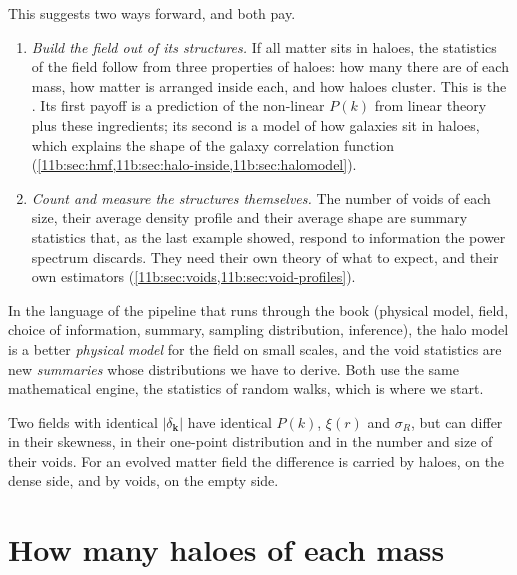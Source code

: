 This suggests two ways forward, and both pay.
\begin{enumerate}[label=(\arabic*),itemsep=1pt]
  \item \emph{Build the field out of its structures.} If all matter sits in
        haloes, the statistics of the field follow from three properties of
        haloes: how many there are of each mass, how matter is arranged inside
        each, and how haloes cluster. This is the . Its first
        payoff is a prediction of the non-linear $P(k)$ from linear theory plus
        these ingredients; its second is a model of how galaxies sit in haloes,
        which explains the shape of the galaxy correlation function
        (\cref{11b:sec:hmf,11b:sec:halo-inside,11b:sec:halomodel}).
  \item \emph{Count and measure the structures themselves.} The number of voids
        of each size, their average density profile and their average shape are
        summary statistics that, as the last example showed, respond to
        information the power spectrum discards. They need their own theory of
        what to expect, and their own estimators
        (\cref{11b:sec:voids,11b:sec:void-profiles}).
\end{enumerate}
In the language of the pipeline that runs through the book (physical model, field,
choice of information, summary, sampling distribution, inference), the halo
model is a better \emph{physical model} for the field on small scales, and the
void statistics are new \emph{summaries} whose distributions we have to derive.
Both use the same mathematical engine, the statistics of random walks, which is
where we start.

\begin{keyidea}
Two fields with identical $|\delta_{\bm k}|$ have identical $P(k)$, $\xi(r)$ and
$\sigma_R$, but can differ in their skewness, in their one-point distribution and
in the number and size of their voids. For an evolved matter field the
difference is carried by haloes, on the dense side, and by voids, on the empty
side.
\end{keyidea}
\section{How many haloes of each mass}
\label{11b:sec:hmf}

